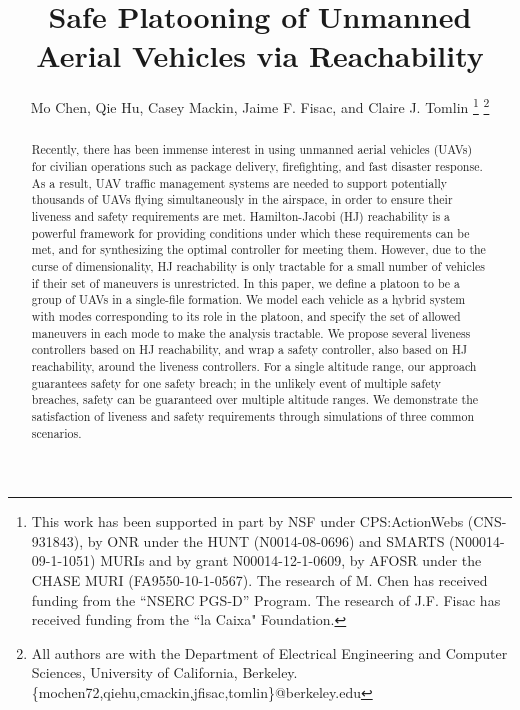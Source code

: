 \documentclass[letterpaper, 10pt, conference]{ieeeconf}      %
\title{\LARGE \bf
Safe Platooning of Unmanned Aerial Vehicles via Reachability}
\author{Mo Chen, Qie Hu, Casey Mackin, Jaime F. Fisac, and Claire J. Tomlin
\thanks{This work has been supported in part by NSF under CPS:ActionWebs (CNS-931843), by ONR under the HUNT (N0014-08-0696) and SMARTS (N00014-09-1-1051) MURIs and by grant N00014-12-1-0609, by AFOSR under the CHASE MURI (FA9550-10-1-0567). The research of M. Chen has received funding from the ``NSERC PGS-D'' Program. The research of J.F. Fisac has received funding from the ``la Caixa" Foundation.}
\thanks{All authors are with the Department of Electrical Engineering and Computer Sciences, University of California, Berkeley. \{mochen72,qiehu,cmackin,jfisac,tomlin\}@berkeley.edu}
}
\begin{document}
\maketitle
\thispagestyle{empty}
\pagestyle{empty}

\begin{abstract}
Recently, there has been immense interest in using unmanned aerial vehicles (UAVs) for civilian operations such as package delivery, firefighting, and fast disaster response. As a result, UAV traffic management systems are needed to support potentially thousands of UAVs flying simultaneously in the airspace, in order to ensure their liveness and safety requirements are met. Hamilton-Jacobi (HJ) reachability is a powerful framework for providing conditions under which these requirements can be met, and for synthesizing the optimal controller for meeting them. However, due to the curse of dimensionality, HJ reachability is only tractable for a small number of vehicles if their set of maneuvers is unrestricted. In this paper, we define a platoon to be a group of UAVs in a single-file formation. We model each vehicle as a hybrid system with modes corresponding to its role in the platoon, and specify the set of allowed maneuvers in each mode to make the analysis tractable. We propose several liveness controllers based on HJ reachability, and wrap a safety controller, also based on HJ reachability, around the liveness controllers. For a single altitude range, our approach guarantees safety for one safety breach; in the unlikely event of multiple safety breaches, safety can be guaranteed over multiple altitude ranges. We demonstrate the satisfaction of liveness and safety requirements through simulations of three common scenarios.
\end{abstract}







% 


\end{document}

